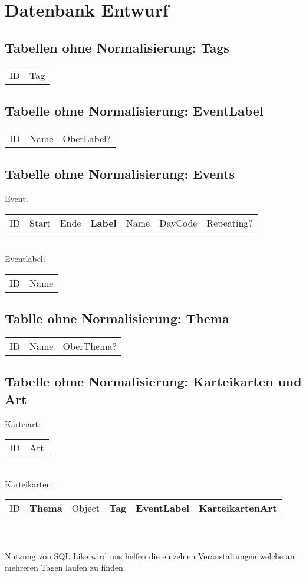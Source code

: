 \documentclass[
a4paper,
twoside,
DIV=12,
BCOR=8mm,
headlineinclude=true,
footinclude=false,
numbers=noenddot,
headheight=40pt, 11pt]{scrartcl}
\begin{document}
	\section*{Datenbank Entwurf}
	\subsection[Tags]{Tabellen ohne Normalisierung: Tags}
	\begin{tabular} {|c| c|}
		ID & Tag  \\
	\end{tabular} 
	\subsection[Label]{Tabelle ohne Normalisierung: EventLabel}
	\begin{tabular}{|c| c| c|}
		ID & Name & OberLabel? \\
	\end{tabular}
	\subsection[Events]{Tabelle ohne Normalisierung: Events}
	Event:
	\begin{tabular}{|c| c| c |c |c |c|c|}
		ID & Start & Ende& \textbf{Label}& Name & DayCode & Repeating? 
	\end{tabular}\\ Eventlabel:
	 \begin{tabular}{|c |c|}
	 	ID & Name
	 \end{tabular}
 	\subsection[Thema]{Tablle ohne Normalisierung: Thema}
 	\begin{tabular}{|c| c| c|}
 		ID & Name & OberThema?
 	\end{tabular}
 	\subsection[Karteikarte]{Tabelle ohne Normalisierung: Karteikarten und Art} Karteiart:
 	\begin{tabular}{c |c |}
 		ID & Art
 	\end{tabular} \\ Karteikarten:
 	\begin{tabular}{|c| c| c| c| c| c|}
 		ID & \textbf{Thema} & Object & \textbf{Tag} & \textbf{EventLabel} & \textbf{KarteikartenArt} 
 	\end{tabular}
 \\ \\
 Nutzung von SQL Like wird uns helfen die einzelnen Veranstaltungen welche an mehreren Tagen laufen zu finden.
\end{document}

